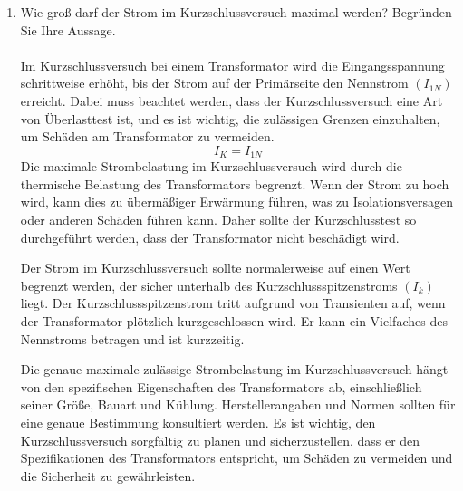 \begin{enumerate}[label=\alph*)]
  \item Wie groß darf der Strom im Kurzschlussversuch maximal werden? Begründen Sie
        Ihre Aussage.\\ \ \\

        Im Kurzschlussversuch bei einem Transformator wird die Eingangsspannung
        schrittweise erhöht, bis der Strom auf der Primärseite den Nennstrom $(I_{1N})$
        erreicht. Dabei muss beachtet werden, dass der Kurzschlussversuch eine Art von
        Überlasttest ist, und es ist wichtig, die zulässigen Grenzen einzuhalten, um
        Schäden am Transformator zu vermeiden.
        \[ I_K = I_{1N} \]
        Die maximale Strombelastung im Kurzschlussversuch wird durch die thermische
        Belastung des Transformators begrenzt. Wenn der Strom zu hoch wird, kann dies
        zu übermäßiger Erwärmung führen, was zu Isolationsversagen oder anderen Schäden
        führen kann. Daher sollte der Kurzschlusstest so durchgeführt werden, dass der
        Transformator nicht beschädigt wird.

        Der Strom im Kurzschlussversuch sollte normalerweise auf einen Wert begrenzt
        werden, der sicher unterhalb des Kurzschlussspitzenstroms $(I_{k})$ liegt. Der
        Kurzschlussspitzenstrom tritt aufgrund von Transienten auf, wenn der
        Transformator plötzlich kurzgeschlossen wird. Er kann ein Vielfaches des
        Nennstroms betragen und ist kurzzeitig.

        Die genaue maximale zulässige Strombelastung im Kurzschlussversuch hängt von
        den spezifischen Eigenschaften des Transformators ab, einschließlich seiner
        Größe, Bauart und Kühlung. Herstellerangaben und Normen sollten für eine genaue
        Bestimmung konsultiert werden. Es ist wichtig, den Kurzschlussversuch
        sorgfältig zu planen und sicherzustellen, dass er den Spezifikationen des
        Transformators entspricht, um Schäden zu vermeiden und die Sicherheit zu
        gewährleisten.


\end{enumerate}
